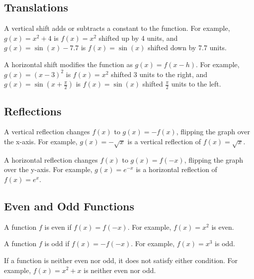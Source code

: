 
\subsection{Translations}
\label{sss:tran-2ed1}

A vertical shift adds or subtracts a constant to the function. For example, $g(x) = x^2 + 4$ is $f(x) = x^2$ shifted up by 4 units, and $g(x) = \sin(x) - 7.7$ is $f(x) = \sin(x)$ shifted down by 7.7 units.

A horizontal shift modifies the function as $g(x) = f(x - h)$. For example, $g(x) = (x - 3)^2$ is $f(x) = x^2$ shifted 3 units to the right, and $g(x) = \sin(x + \frac{\pi}{2})$ is $f(x) = \sin(x)$ shifted $\frac{\pi}{2}$ units to the left.

\subsection{Reflections}
\label{sss:refl-afab}

A vertical reflection changes $f(x)$ to $g(x) = -f(x)$, flipping the graph over the x-axis. For example, $g(x) = -\sqrt{x}$ is a vertical reflection of $f(x) = \sqrt{x}$.

A horizontal reflection changes $f(x)$ to $g(x) = f(-x)$, flipping the graph over the y-axis. For example, $g(x) = e^{-x}$ is a horizontal reflection of $f(x) = e^x$.

\subsection{Even and Odd Functions}
\label{sss:even-a6f0}

A function $f$ is even if $f(x) = f(-x)$. For example, $f(x) = x^2$ is even. 

A function $f$ is odd if $f(x) = -f(-x)$. For example, $f(x) = x^3$ is odd.

If a function is neither even nor odd, it does not satisfy either condition. For example, $f(x) = x^2 + x$ is neither even nor odd.

